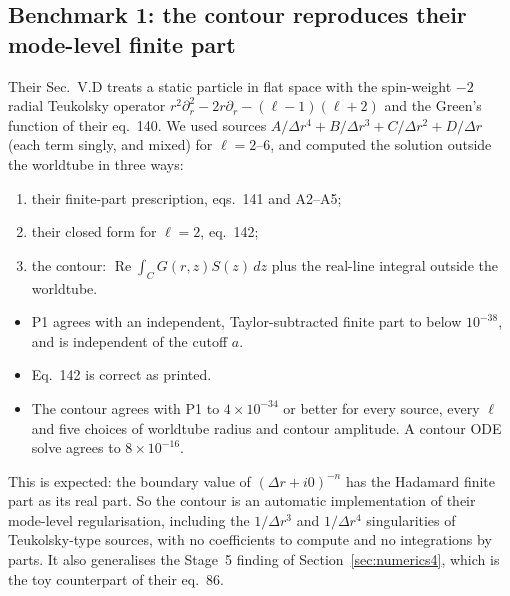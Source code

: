 \documentclass[11pt,a4paper]{article}
\renewcommand{\Re}{\operatorname{Re}}
\begin{document}
\subsection{Benchmark 1: the contour reproduces their mode-level finite part}
Their Sec.~V.D treats a static particle in flat space with the spin-weight $-2$ radial Teukolsky operator $r^2\partial_r^2-2r\partial_r-(\ell-1)(\ell+2)$ and the Green's function of their eq.~140.
We used sources $A/\Delta r^4+B/\Delta r^3+C/\Delta r^2+D/\Delta r$ (each term singly, and mixed) for $\ell=2$--$6$, and computed the solution outside the worldtube in three ways:
\begin{enumerate}[nosep,label=P\arabic*.]
\item their finite-part prescription, eqs.~141 and A2--A5;
\item their closed form for $\ell=2$, eq.~142;
\item the contour: $\Re\int_C G(r,z)S(z)\,dz$ plus the real-line integral outside the worldtube.
\end{enumerate}
\begin{itemize}[nosep]
\item P1 agrees with an independent, Taylor-subtracted finite part to below $10^{-38}$, and is independent of the cutoff $a$.
\item Eq.~142 is correct as printed.
\item The contour agrees with P1 to $4\times10^{-34}$ or better for every source, every $\ell$ and five choices of worldtube radius and contour amplitude. A contour ODE solve agrees to $8\times10^{-16}$.
\end{itemize}
This is expected: the boundary value of $(\Delta r+i0)^{-n}$ has the Hadamard finite part as its real part.
So the contour is an automatic implementation of their mode-level regularisation, including the $1/\Delta r^3$ and $1/\Delta r^4$ singularities of Teukolsky-type sources, with no coefficients to compute and no integrations by parts.
It also generalises the Stage~5 finding of Section~\ref{sec:numerics4}, which is the toy counterpart of their eq.~86.
\end{document}
